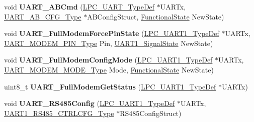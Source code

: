 \begin{DoxyCompactItemize}
\item 
\hypertarget{group___u_a_r_t___public___functions_ga51b07c8e7c54845841a97ec9a8d67c3b}{void {\bfseries \-U\-A\-R\-T\-\_\-\-A\-B\-Cmd} (\hyperlink{struct_l_p_c___u_a_r_t___type_def}{\-L\-P\-C\-\_\-\-U\-A\-R\-T\-\_\-\-Type\-Def} $\ast$\-U\-A\-R\-Tx, \hyperlink{struct_u_a_r_t___a_b___c_f_g___type}{\-U\-A\-R\-T\-\_\-\-A\-B\-\_\-\-C\-F\-G\-\_\-\-Type} $\ast$\-A\-B\-Config\-Struct, \hyperlink{group___l_p_c___types___public___types_gac9a7e9a35d2513ec15c3b537aaa4fba1}{\-Functional\-State} \-New\-State)}\label{group___u_a_r_t___public___functions_ga51b07c8e7c54845841a97ec9a8d67c3b}

\item 
\hypertarget{group___u_a_r_t___public___functions_ga5a21807b2f967d1ed1de7bd468cbd9ad}{void {\bfseries \-U\-A\-R\-T\-\_\-\-Full\-Modem\-Force\-Pin\-State} (\hyperlink{struct_l_p_c___u_a_r_t1___type_def}{\-L\-P\-C\-\_\-\-U\-A\-R\-T1\-\_\-\-Type\-Def} $\ast$\-U\-A\-R\-Tx, \hyperlink{group___u_a_r_t___public___types_gabfc7ec239b7d598e6a2cc163e66b76fc}{\-U\-A\-R\-T\-\_\-\-M\-O\-D\-E\-M\-\_\-\-P\-I\-N\-\_\-\-Type} \-Pin, \hyperlink{group___u_a_r_t___public___types_gada493f726a4ea247b209b49fb8c85a52}{\-U\-A\-R\-T1\-\_\-\-Signal\-State} \-New\-State)}\label{group___u_a_r_t___public___functions_ga5a21807b2f967d1ed1de7bd468cbd9ad}

\item 
\hypertarget{group___u_a_r_t___public___functions_gad65d361221a648575a5328ec1a243aa9}{void {\bfseries \-U\-A\-R\-T\-\_\-\-Full\-Modem\-Config\-Mode} (\hyperlink{struct_l_p_c___u_a_r_t1___type_def}{\-L\-P\-C\-\_\-\-U\-A\-R\-T1\-\_\-\-Type\-Def} $\ast$\-U\-A\-R\-Tx, \hyperlink{group___u_a_r_t___public___types_ga55fc73bec4c58ad15d24b05095c4523a}{\-U\-A\-R\-T\-\_\-\-M\-O\-D\-E\-M\-\_\-\-M\-O\-D\-E\-\_\-\-Type} \-Mode, \hyperlink{group___l_p_c___types___public___types_gac9a7e9a35d2513ec15c3b537aaa4fba1}{\-Functional\-State} \-New\-State)}\label{group___u_a_r_t___public___functions_gad65d361221a648575a5328ec1a243aa9}

\item 
\hypertarget{group___u_a_r_t___public___functions_gaee50c6ea6e2ccfa7cc6edceee5833d1e}{uint8\-\_\-t {\bfseries \-U\-A\-R\-T\-\_\-\-Full\-Modem\-Get\-Status} (\hyperlink{struct_l_p_c___u_a_r_t1___type_def}{\-L\-P\-C\-\_\-\-U\-A\-R\-T1\-\_\-\-Type\-Def} $\ast$\-U\-A\-R\-Tx)}\label{group___u_a_r_t___public___functions_gaee50c6ea6e2ccfa7cc6edceee5833d1e}

\item 
\hypertarget{group___u_a_r_t___public___functions_ga61acf8ebde89ef2b8c05c2d2a9ac9e7c}{void {\bfseries \-U\-A\-R\-T\-\_\-\-R\-S485\-Config} (\hyperlink{struct_l_p_c___u_a_r_t1___type_def}{\-L\-P\-C\-\_\-\-U\-A\-R\-T1\-\_\-\-Type\-Def} $\ast$\-U\-A\-R\-Tx, \hyperlink{struct_u_a_r_t1___r_s485___c_t_r_l_c_f_g___type}{\-U\-A\-R\-T1\-\_\-\-R\-S485\-\_\-\-C\-T\-R\-L\-C\-F\-G\-\_\-\-Type} $\ast$\-R\-S485\-Config\-Struct)}\label{group___u_a_r_t___public___functions_ga61acf8ebde89ef2b8c05c2d2a9ac9e7c}


\end{DoxyCompactItemize}
